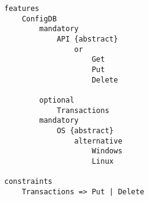 \documentclass{standalone}
\begin{document}
\begin{lstlisting}[language=UVL]
features
	ConfigDB	
		mandatory
			API {abstract}
				or
					Get
					Put
					Delete

		optional
			Transactions
		mandatory
			OS {abstract}
				alternative
					Windows
					Linux
				
constraints
	Transactions => Put | Delete
\end{lstlisting}
\end{document}
